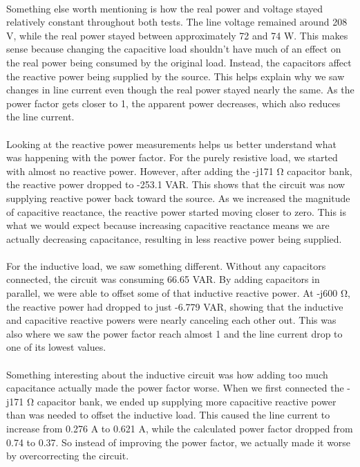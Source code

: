 \paragraph{}Something else worth mentioning is how the real power and
voltage stayed relatively
constant throughout both tests. The line voltage remained around 208
V, while the real power stayed
between approximately 72 and 74 W. This makes sense because changing
the capacitive load shouldn't
have much of an effect on the real power being consumed by the
original load. Instead, the capacitors
affect the reactive power being supplied by the source. This helps
explain why we saw changes in line
current even though the real power stayed nearly the same. As the
power factor gets closer to 1, the
apparent power decreases, which also reduces the line current.

\paragraph{}Looking at the reactive power measurements helps us
better understand what was happening
with the power factor. For the purely resistive load, we started with
almost no reactive power. However,
after adding the -j171 Ω capacitor bank, the reactive power dropped
to -253.1 VAR. This shows that the
circuit was now supplying reactive power back toward the source. As
we increased the magnitude of capacitive
reactance, the reactive power started moving closer to zero. This is
what we would expect because increasing
capacitive reactance means we are actually decreasing capacitance,
resulting in less reactive power being supplied.

\paragraph{}For the inductive load, we saw something different.
Without any capacitors connected, the circuit
was consuming 66.65 VAR. By adding capacitors in parallel, we were
able to offset some of that inductive reactive
power. At -j600 Ω, the reactive power had dropped to just -6.779 VAR,
showing that the inductive and capacitive
reactive powers were nearly canceling each other out. This was also
where we saw the power factor reach almost
1 and the line current drop to one of its lowest values.

\paragraph{}Something interesting about the inductive circuit was how
adding too much capacitance actually made
the power factor worse. When we first connected the -j171 Ω capacitor
bank, we ended up supplying more capacitive
reactive power than was needed to offset the inductive load. This
caused the line current to increase from 0.276 A
to 0.621 A, while the calculated power factor dropped from 0.74 to
0.37. So instead of improving the power factor,
we actually made it worse by overcorrecting the circuit.

